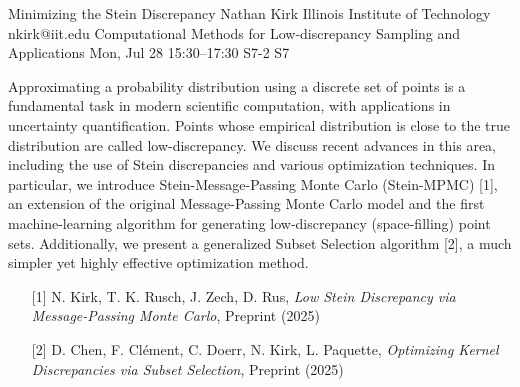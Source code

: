 \begin{talk}
  {Minimizing the Stein Discrepancy}%
  {Nathan Kirk}%
  {Illinois Institute of Technology}%
  {nkirk@iit.edu}%
  {Computational Methods for Low-discrepancy Sampling and Applications}%
  {}%
  {Mon, Jul 28 15:30–17:30}%
  {S7-2}%
  {S7}%
				
			
Approximating a probability distribution using a discrete set of points is a fundamental task in modern scientific computation, with applications in uncertainty quantification. Points whose empirical distribution is close to the true distribution are called low-discrepancy. We discuss recent advances in this area, including the use of Stein discrepancies and various optimization techniques. In particular, we introduce Stein-Message-Passing Monte Carlo (Stein-MPMC) [1], an extension of the original Message-Passing Monte Carlo model and the first machine-learning algorithm for generating low-discrepancy (space-filling) point sets. Additionally, we present a generalized Subset Selection algorithm [2], a much simpler yet highly effective optimization method.

\medskip

\begin{enumerate}
	\item[{[1]}] N. Kirk, T. K. Rusch, J. Zech, D. Rus, \textit{Low Stein Discrepancy via Message-Passing Monte Carlo}, Preprint (2025)
	\item[{[2]}] D. Chen, F. Clément, C. Doerr, N. Kirk, L. Paquette, \textit{Optimizing Kernel Discrepancies via Subset Selection}, Preprint (2025)
\end{enumerate}


\end{talk}

